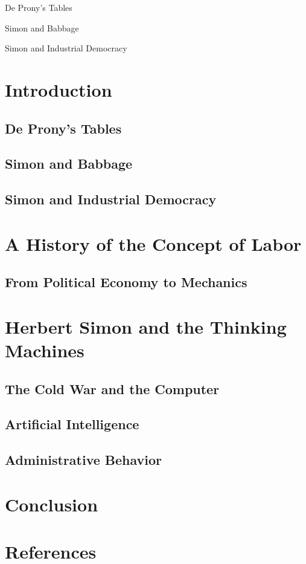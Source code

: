 \documentclass[version=last,draft=true,paper=A4,portrait,twoside=true,twocolumn=false,headinclude=false,footinclude=false,fontsize=11,BCOR=15mm,DIV=calc,pagesize=auto,titlepage=firstiscover,mpinclude=true,open=right,chapterprefix=true,numbers=autoendperiod,headsepline=false,parskip=false]{scrbook}
\begin{document}
De Prony's Tables

Simon and Babbage

Simon and Industrial Democracy

\lipsum
\mainmatter
\pagestyle{scrheadings}
\chapter{Introduction}
\label{sec:org38f9efc}
\section{De Prony's Tables}
\label{sec:org4c3c909}
\section{Simon and Babbage}
\label{sec:org0413090}
\section{Simon and Industrial Democracy}
\label{sec:orgc8721e0}
\chapter{A History of the Concept of Labor}
\label{sec:orgfed6883}
\section{From Political Economy to Mechanics}
\label{sec:org0db3e41}
\lipsum
\chapter{Herbert Simon and the Thinking Machines}
\label{sec:orgd0e89ee}
\section{The Cold War and the Computer}
\label{sec:org6e81264}
\lipsum
\section{Artificial Intelligence}
\label{sec:org217d965}
\lipsum
\section{Administrative Behavior}
\label{sec:org19668d2}
\lipsum

\backmatter
\chapter{Conclusion} 
\lipsum
\chapter{References} 
\lipsum
\end{document}
